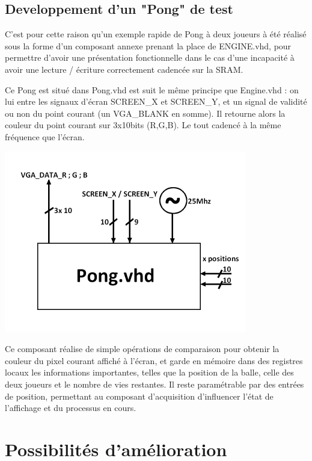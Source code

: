 \documentclass[10pt,a4paper]{report}
\begin{document}
\section{Developpement d'un "Pong" de test}

C'est pour cette raison qu'un exemple rapide de Pong à deux joueurs à été réalisé sous la forme d'un composant annexe prenant la place de ENGINE.vhd, pour permettre d'avoir une présentation fonctionnelle dans le cas d'une incapacité à avoir une lecture / écriture correctement cadencée sur la SRAM.

Ce Pong est situé dans Pong.vhd est suit le même principe que Engine.vhd : on lui entre les signaux d'écran SCREEN\_X et SCREEN\_Y, et un signal de validité ou non du point courant (un VGA\_BLANK en somme). Il retourne alors la couleur du point courant sur 3x10bits (R,G,B). Le tout cadencé à la même fréquence que l'écran.

\begin{center}
\includegraphics[width=300pt]{gfx/pong.png}
\end{center}

Ce composant réalise de simple opérations de comparaison pour obtenir la couleur du pixel courant affiché à l'écran, et garde en mémoire dans des registres locaux les informations importantes, telles que la position de la balle, celle des deux joueurs et le nombre de vies restantes. Il reste paramétrable par des entrées de position, permettant au composant d'acquisition d'influencer l'état de l'affichage et du processus en cours.

\chapter{Possibilités d'amélioration}
\end{document}
